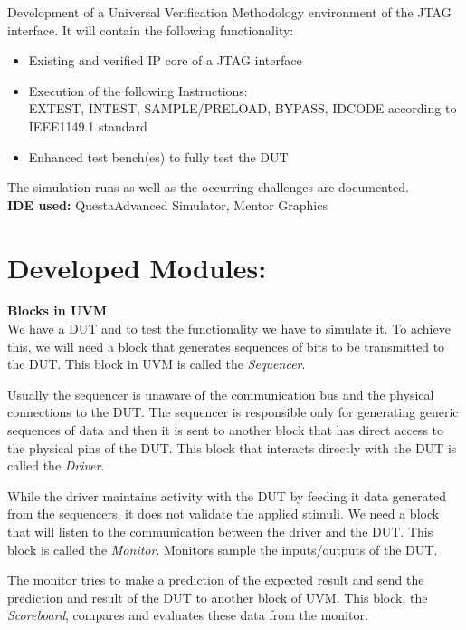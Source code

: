 \documentclass[a4paper,11pt]{article}
\begin{document}
Development of a Universal Verification Methodology environment of the JTAG interface. It will contain the following functionality:

\begin{itemize}
\item Existing and verified IP core of a JTAG interface
\item Execution of the following Instructions: \\EXTEST, INTEST, SAMPLE/PRELOAD, BYPASS, IDCODE according to IEEE1149.1 standard
\item Enhanced test bench(es) to fully test the DUT
\end{itemize}

The simulation runs as well as the occurring challenges are documented.
\\ \textbf{IDE used:} Questa\textregistered Advanced Simulator, Mentor Graphics

\newpage
\pagebreak
\section{Developed Modules:}

\textbf{Blocks in UVM}
\ \\
We have a DUT and to test the functionality we have to simulate it. To achieve this, we will need a block that generates sequences of bits to be transmitted to the DUT. This block in UVM is called the \textit{Sequencer}. 

Usually the sequencer is unaware of the communication bus and the physical connections to the DUT. The sequencer is responsible only for generating generic sequences of data and then it is sent to another block that has direct access to the physical pins of the DUT. This block that interacts directly with the DUT is called the \textit{Driver}.

While the driver maintains activity with the DUT by feeding it data generated from the sequencers, it does not validate the applied stimuli. We need a block that will listen to the communication between the driver and the DUT. This block is called the \textit{Monitor}. Monitors sample the inputs/outputs of the DUT.

The monitor tries to make a prediction of the expected result and send the prediction and result of the DUT to another block of UVM. This block, the \textit{Scoreboard}, compares and evaluates these data from the monitor.
\end{document}
